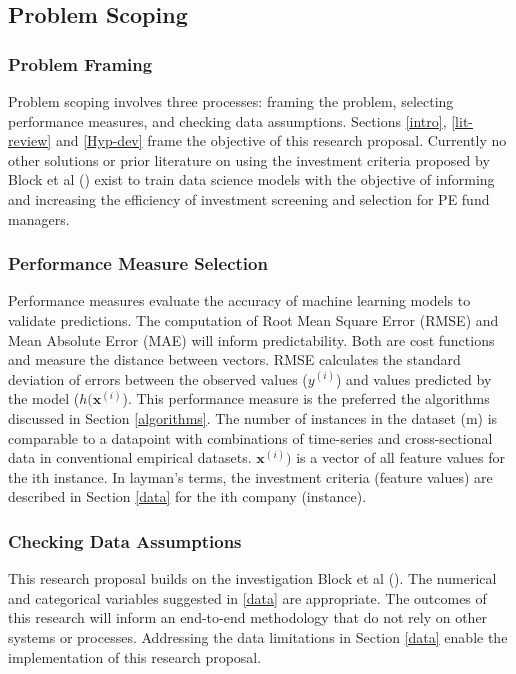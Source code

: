 \documentclass[12pt]{article}
\begin{document}
\subsection{Problem Scoping} \label{method-prob-solv}
\subsubsection{Problem Framing}
Problem scoping involves three processes: framing the problem, selecting performance measures, and checking data assumptions.
Sections \ref{intro}, \ref{lit-review} and \ref{Hyp-dev} frame the objective of this research proposal.
Currently no other solutions or prior literature on using the investment criteria proposed by Block et al (\citeyear{BLOCK2019329}) exist
to train data science models with the objective of informing and increasing the efficiency of investment screening and selection for PE fund managers.
\subsubsection{Performance Measure Selection} \label{perf-meas}
Performance measures evaluate the accuracy of machine learning models to validate predictions.
The computation of Root Mean Square Error (RMSE) and Mean Absolute Error (MAE) will inform predictability.
Both are cost functions and measure the distance between vectors.
RMSE calculates the standard deviation of errors between the observed values ($y^{(i)}$) and values predicted by the model ($h(\textbf{x}^{(i)}$). 
This performance measure is the preferred the algorithms discussed in Section \ref{algorithms}.
The number of instances in the dataset (m) is comparable to a datapoint with combinations of time-series and cross-sectional data in conventional empirical datasets.
$\textbf{x}^{(i)})$ is a vector of all feature values for the ith instance.
In layman's terms, the investment criteria (feature values) are described in Section \ref{data} for the ith company (instance).
\subsubsection{Checking Data Assumptions}
This research proposal builds on the investigation Block et al (\citeyear{BLOCK2019329}).
The numerical and categorical variables suggested in \ref{data} are appropriate. 
The outcomes of this research will inform an end-to-end methodology that do not rely on other systems or processes.
Addressing the data limitations in Section \ref{data} enable the implementation of this research proposal.
\end{document}
